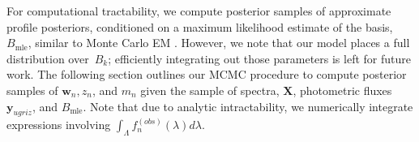\documentclass{article} %
\begin{document}
For computational tractability, we compute posterior samples of approximate profile posteriors, conditioned on a maximum likelihood estimate of the basis,~$B_{\text{mle}}$, similar to Monte Carlo EM  \cite{wei1990monte}. 
However, we note that our model places a full distribution over~$B_k$; efficiently integrating out those parameters is left for future work.
The following section outlines our MCMC procedure to compute posterior samples of $\mathbf{w}_n, z_n$, and $m_n$ given the sample of spectra, $\mathbf{X}$, photometric fluxes $\mathbf{y}_{ugriz}$, and $B_{\text{mle}}$.
Note that due to analytic intractability, we numerically integrate expressions involving $\int_\Lambda f_n^{(obs)}(\lambda) d\lambda$.

\end{document}
